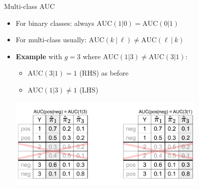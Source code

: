 \documentclass[11pt,compress,t,notes=noshow, xcolor=table]{beamer}
\begin{document}
\begin{vbframe}{Multi-class AUC}

\begin{itemize}
\item For binary classes: always $\text{AUC}(1 | 0) = \text{AUC}(0 | 1)$

\item For multi-class usually:
$\text{AUC}(k ~|~ \ell) \neq \text{AUC}(\ell ~|~ k)$

\item
\textbf{Example} with $g=3$ where $\text{AUC}(1|3) \neq \text{AUC}(3|1) $:
\begin{itemize}
\item $\text{AUC}(3|1) = 1$ (RHS) as before 
\item $\text{AUC}(1|3) \neq 1$ (LHS) 
\end{itemize}

\centerline{\includegraphics[trim = 0 15 00 10, clip, width=0.75\textwidth]{figure_man/multiclass-auc.pdf}}

\end{itemize}


\end{vbframe}

\end{document}
